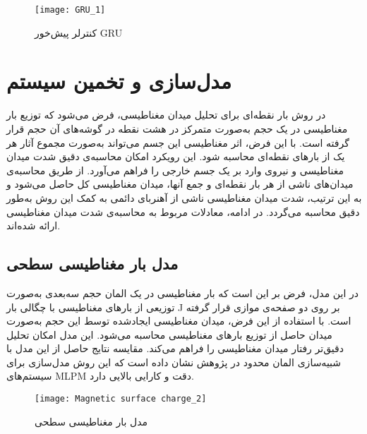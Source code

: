 \begin{figure}[ht]
\centering
\texttt{[image: GRU\_1]}
\caption{کنترلر پیش‌خور GRU \cite{RN61}}
\label{fig:GRU}
\end{figure}

\section{مدل‌سازی و تخمین سیستم}
در روش بار نقطه‌ای برای تحلیل میدان مغناطیسی، فرض می‌شود که توزیع بار مغناطیسی در یک حجم به‌صورت متمرکز در هشت نقطه در گوشه‌های آن حجم قرار گرفته است. با این فرض، اثر مغناطیسی این جسم می‌تواند به‌صورت مجموع آثار هر یک از بارهای نقطه‌ای محاسبه شود. این رویکرد امکان محاسبه‌ی دقیق شدت میدان مغناطیسی و نیروی وارد بر یک جسم خارجی را فراهم می‌آورد. از طریق محاسبه‌ی میدان‌های ناشی از هر بار نقطه‌ای و جمع آنها، میدان مغناطیسی کل حاصل می‌شود و به این ترتیب، شدت میدان مغناطیسی ناشی از آهنربای دائمی به کمک این روش به‌طور دقیق محاسبه می‌گردد. در ادامه، معادلات مربوط به محاسبه‌ی شدت میدان مغناطیسی ارائه شده‌اند.
\subsection{مدل بار مغناطیسی سطحی}
در این مدل، فرض بر این است که بار مغناطیسی در یک المان حجم سه‌بعدی به‌صورت توزیعی از بارهای مغناطیسی با چگالی بار J بر روی دو صفحه‌ی موازی قرار گرفته است. با استفاده از این فرض، میدان مغناطیسی ایجادشده توسط این حجم به‌صورت میدان حاصل از توزیع بارهای مغناطیسی محاسبه می‌شود. این مدل امکان تحلیل دقیق‌تر رفتار میدان مغناطیسی را فراهم می‌کند. مقایسه نتایج حاصل از این مدل با شبیه‌سازی المان محدود
 در پژوهش
\cite{RN44}
نشان داده است که این روش مدل‌سازی برای سیستم‌های MLPM دقت و کارایی بالایی دارد.

\begin{figure}[ht]
\centering
\texttt{[image: Magnetic surface charge\_2]}
\caption{مدل بار مغناطیسی سطحی \cite{RN44}}
\label{fig:Magnetic surface charge}
\end{figure}

